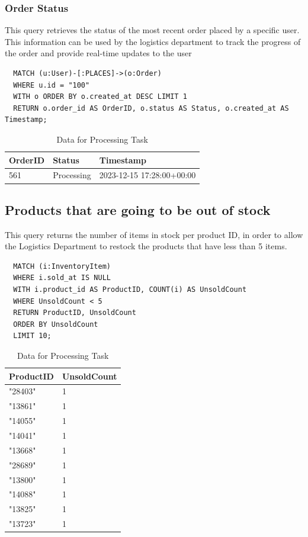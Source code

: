 \documentclass[a4paper,12pt]{article}
\begin{document}
\subsubsection{Order Status}
This query retrieves the status of the most recent order placed by a specific user. This information can be used by the logistics department to track the progress of the order and provide real-time updates to the user
\begin{verbatim}
  MATCH (u:User)-[:PLACES]->(o:Order)
  WHERE u.id = "100"
  WITH o ORDER BY o.created_at DESC LIMIT 1
  RETURN o.order_id AS OrderID, o.status AS Status, o.created_at AS Timestamp;
\end{verbatim}
\begin{table}[h!]
  \centering
  \caption{Data for Processing Task}
  \label{tab:processing_data}
  \begin{tabular}{l l l}
      \toprule
      \textbf{OrderID} & \textbf{Status} & \textbf{Timestamp} \\
      \midrule
      561 & Processing & 2023-12-15 17:28:00+00:00 \\
      \bottomrule
  \end{tabular}
\end{table}

\subsection{Products that are going to be out of stock}
This query returns the number of items in stock per product ID, in order to allow the Logistics Department to restock the products that have less than 5 items.
\begin{verbatim}
  MATCH (i:InventoryItem)
  WHERE i.sold_at IS NULL
  WITH i.product_id AS ProductID, COUNT(i) AS UnsoldCount
  WHERE UnsoldCount < 5
  RETURN ProductID, UnsoldCount
  ORDER BY UnsoldCount
  LIMIT 10;
\end{verbatim}
\begin{table}[h!]
  \centering
  \caption{Data for Processing Task}
  \label{tab:processing_data}
  \begin{tabular}{l l}
      \toprule
      \textbf{ProductID} & \textbf{UnsoldCount} \\
      \midrule
      "28403" &	1 \\
      "13861" & 1 \\
      "14055" & 1 \\
      "14041" & 1 \\
      "13668" & 1 \\
      "28689" & 1 \\
      "13800" & 1 \\
      "14088" & 1 \\
      "13825" & 1 \\
      "13723" & 1 \\
      \bottomrule
  \end{tabular}
\end{table}
\end{document}
